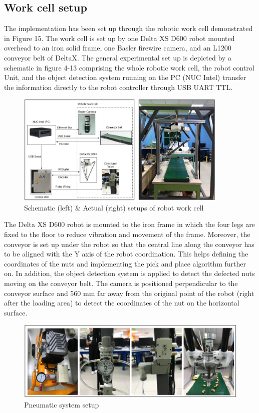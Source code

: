\documentclass[10pt, letterpaper]{article}
\begin{document}
\subsection{Work cell setup}
    The implementation has been set up through the robotic work cell demonstrated in Figure 15. The work cell is set up by one Delta XS D600 robot mounted overhead to an iron solid frame, one Basler firewire camera, and an L1200 conveyor belt of DeltaX. The general experimental set up is depicted by a schematic in figure 4-13 comprising the whole robotic work cell, the robot control Unit, and the object detection system running on the PC (NUC Intel) transfer the information directly to the robot controller through USB UART TTL.\par
    \begin{figure}[h]
        \centering
        \includegraphics[width=0.9\textwidth]{fig15.JPG}
        \caption{Schematic (left) \& Actual (right) setups of robot work cell }
    \end{figure}
    The Delta XS D600 robot is mounted to the iron frame in which the four legs are fixed to the floor to reduce vibration and movement of the frame. Moreover, the conveyor is set up under the robot so that the central line along the conveyor has to be aligned with the Y axis of the robot coordination. This helps defining the coordinates of the nuts and implementing the pick and place algorithm further on. In addition, the object detection system is applied to detect the defected nuts moving on the conveyor belt. The camera is positioned perpendicular to the conveyor surface and 560 mm far away from the original point of the robot (right after the loading area) to detect the coordinates of the nut on the horizontal surface.\par
    \begin{figure}[h]
        \centering
        \includegraphics[width=\textwidth]{fig16.JPG}
        \caption{Pneumatic system setup}
    \end{figure}
\end{document}
